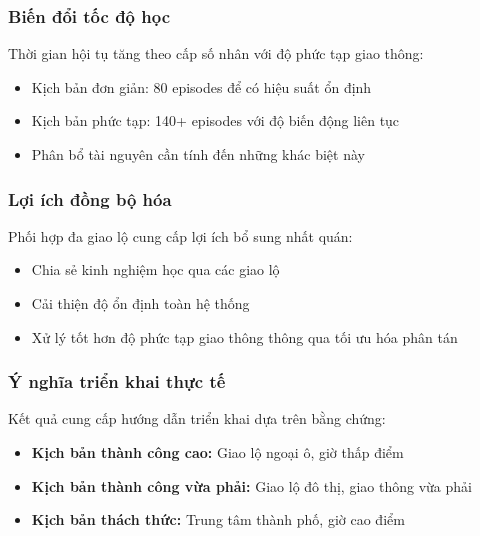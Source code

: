 \subsubsection{Biến đổi tốc độ học}
Thời gian hội tụ tăng theo cấp số nhân với độ phức tạp giao thông:
\begin{itemize}
    \item Kịch bản đơn giản: 80 episodes để có hiệu suất ổn định
    \item Kịch bản phức tạp: 140+ episodes với độ biến động liên tục
    \item Phân bổ tài nguyên cần tính đến những khác biệt này
\end{itemize}

\subsubsection{Lợi ích đồng bộ hóa}
Phối hợp đa giao lộ cung cấp lợi ích bổ sung nhất quán:
\begin{itemize}
    \item Chia sẻ kinh nghiệm học qua các giao lộ
    \item Cải thiện độ ổn định toàn hệ thống
    \item Xử lý tốt hơn độ phức tạp giao thông thông qua tối ưu hóa phân tán
\end{itemize}

\subsubsection{Ý nghĩa triển khai thực tế}
Kết quả cung cấp hướng dẫn triển khai dựa trên bằng chứng:
\begin{itemize}
    \item \textbf{Kịch bản thành công cao:} Giao lộ ngoại ô, giờ thấp điểm
    \item \textbf{Kịch bản thành công vừa phải:} Giao lộ đô thị, giao thông vừa phải
    \item \textbf{Kịch bản thách thức:} Trung tâm thành phố, giờ cao điểm
\end{itemize}



